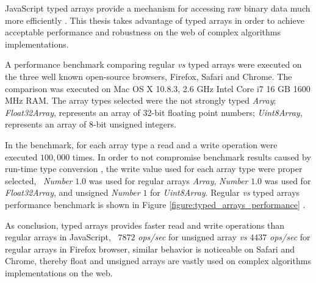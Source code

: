 JavaScript typed arrays provide a mechanism for accessing raw binary data much more efficiently \cite{MDN2013} \cite{TypedArray2013}. This thesis takes advantage of typed arrays in order to achieve acceptable performance and robustness on the web of complex algorithms implementations.

A performance benchmark comparing regular \textit{vs} typed arrays were executed on the three well known open-source browsers, Firefox, Safari and Chrome. The comparison was executed on Mac OS X 10.8.3, 2.6 GHz Intel Core i7 16 GB 1600 MHz RAM. The array types selected were the not strongly typed \textit{Array}; \textit{Float32Array}, represents an array of 32-bit floating point numbers; \textit{Uint8Array}, represents an array of 8-bit unsigned integers.

In the benchmark, for each array type a read and a write operation were executed $100,000$ times. In order to not compromise benchmark results caused by run-time type conversion \cite{International2009}, the write value used for each array type were proper selected, \eg\ \textit{Number} $1.0$ was used for regular arrays \textit{Array}, \textit{Number} $1.0$ was used for \textit{Float32Array}, and unsigned \textit{Number} $1$ for \textit{Uint8Array}. Regular \textit{vs} typed arrays performance benchmark is shown in Figure \ref{figure:typed_arrays_performance} \cite{TypedArrayPerformance2013}.

As conclusion, typed arrays provides faster read and write operations than regular arrays in JavaScript, \ie\ $7872$ \textit{ops/sec} for unsigned array \textit{vs} $4437$ \textit{ops/sec} for regular arrays in Firefox browser, similar behavior is noticeable on Safari and Chrome, thereby float and unsigned arrays are vastly used on complex algorithms implementations on the web.

